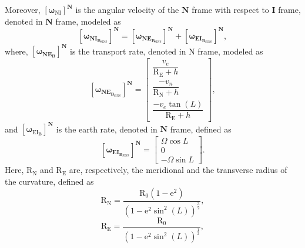 \documentclass[3p]{elsarticle}
\begin{document}
	Moreover, \({\left[{\boldsymbol{\omega}}_{\mathrm{NI}}\right]}^{\mathbf{N}}\) is the angular velocity of
the \({\mathbf{N}}\) frame with respect to \({\mathbf{I}}\) frame, denoted in \({\mathbf{N}}\) frame, modeled as
\begin{equation}
{\left[{\boldsymbol{\omega}}_{\mathbf{NI}_{\mathbf{B}_{\text{SINS}}}}\right]}^{\mathbf{N}} = {\left[{\boldsymbol{\omega}}_{\mathbf{NE}_{\mathbf{B}_{\text{SINS}}}}\right]}^{\mathbf{N}} + {\left[{\boldsymbol{\omega}}_{\mathbf{EI}_{\mathbf{B}_{\text{SINS}}}}\right]}^{\mathbf{N}},
\end{equation}
where, \({\left[{\boldsymbol{\omega}}_{\mathbf{NE}_{\mathbf{B}}}\right]}^{\mathbf{N}}\) is the transport rate, denoted in N frame, modeled as
\begin{equation}
	{\left[{\boldsymbol{\omega}}_{{\mathbf{NE}}_{\mathbf{B}_{\text{SINS}}}}\right]}^{\mathbf{N}} = \begin{bmatrix}
		\dfrac{v_e}{\mathrm{R_E} + h}\\[1em]
		\dfrac{-v_n}{\mathrm{R_N} + h} \\[1em]
		\dfrac{-v_e\tan(L)}{\mathrm{R_E} + h}
	\end{bmatrix},
\end{equation}
and
\({\left[{\boldsymbol{\omega}}_{\mathrm{EI}_{\mathbf{B}}}\right]}^{\mathbf{N}} \) is the earth rate, denoted in \({\mathbf{N}}\) frame, defined as
\begin{equation}
	{\left[{\boldsymbol{\omega}}_{{\mathbf{EI}}_{\mathbf{B}_{\text{SINS}}}}\right]}^{\mathbf{N}} = \begin{bmatrix}
		{{\Omega}}\cos {{L}} \\
		0 \\
		-{\Omega}\sin {{L}}
	\end{bmatrix}.
\end{equation}
Here, \(\mathrm{R_N}\) and \(\mathrm{R_E}\) are, respectively, the meridional and the transverse radius of the curvature, defined as
\begin{equation}
	\mathrm{R_N} = \dfrac{\mathrm{R_0}(1-\mathrm{e}^2)}{{(1-\mathrm{e}^2\sin^2(L))}^{\frac{3}{2}}},
\end{equation}
\begin{equation}
	\mathrm{R_E} = \dfrac{\mathrm{R_0}}{{(1-\mathrm{e}^2\sin^2(L))}^{\frac{1}{2}}},
\end{equation}
\end{document}
